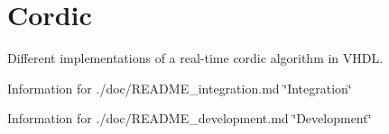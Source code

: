 

\section*{Cordic}

Different implementations of a real-\/time cordic algorithm in V\+H\+DL.


\begin{DoxyItemize}
\item Information for ./doc/\+R\+E\+A\+D\+M\+E\+\_\+integration.md \char`\"{}\+Integration\char`\"{}
\item Information for ./doc/\+R\+E\+A\+D\+M\+E\+\_\+development.md \char`\"{}\+Development\char`\"{} 
\end{DoxyItemize}
